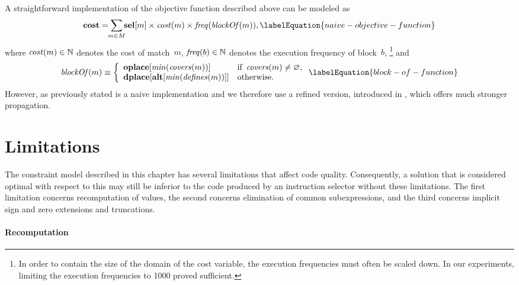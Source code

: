 A straightforward implementation of the \gls{objective function} described above
can be modeled as
%
\begin{equation}
  \mVar{cost} =
  \sum_{\mathclap{m \in \mMatchSet}}
  \mVar{sel}[m] \times \mCost(m) \times \mFreq(\mBlockOf(m)),
  \labelEquation{naive-objective-function}
\end{equation}
%
where \mbox{$\operatorname{\textrm{\textit{cost}}}(m) \in \mathbb{N}$} denotes the cost of \gls{match}~$m$,
\mbox{$\operatorname{\textrm{\textit{freq}}}(b) \in \mathbb{N}$} denotes the execution frequency of
block~$b$\!,\hspace{-1pt}%
%
\footnote{%
  In order to contain the size of the \gls{domain} of the \gls{cost variable},
  the execution frequencies must often be scaled down.
  In our experiments, limiting the execution frequencies to \num{1000} proved
  sufficient.
}
%
and
%
\begin{equation}
  \mBlockOf(m)
  \equiv
  \left\{
  \begin{array}{ll}
      \mVar{oplace}[\mMin(\mCovers(m))]
    & \text{if } \mCovers(m) \neq \mEmptySet, \\
      \mVar{dplace}[\mVar{alt}[\mMin(\mDefines(m))]]
    & \text{otherwise}.
  \end{array}
  \right.
  \labelEquation{block-of-function}
\end{equation}
%
However, as previously stated  is a naive
implementation and we therefore use a refined version, introduced in
, which offers much stronger \gls{propagation}.


\section{Limitations}

The \gls{constraint model} described in this chapter has several limitations
that affect code quality.
%
Consequently, a \gls{solution} that is considered optimal with respect to this
 may still be inferior to the code produced by an
\gls{instruction selector} without these limitations.
%
The first limitation concerns \gls{recomputation} of values, the second concerns
elimination of common subexpressions, and the third concerns implicit sign and
zero extensions and truncations.


\paragraph{Recomputation}

